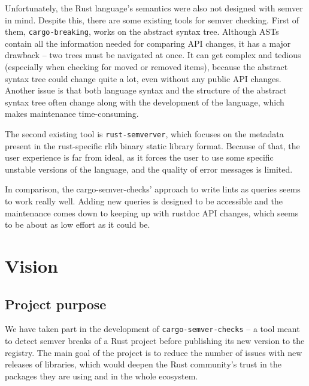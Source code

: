 \documentclass[licencjacka,en]{pracamgr}
\begin{document}
Unfortunately, the Rust language's semantics were also not designed with semver in mind.
Despite this, there are some existing tools for semver checking. First of them,
\texttt{cargo-breaking}, works on the abstract syntax tree. Although ASTs contain all the
information needed for comparing API changes, it has a major drawback -- two trees must be
navigated at once. It can get complex and tedious (especially when checking for moved or removed
items), because the abstract syntax tree could change quite a lot, even without any public API
changes. Another issue is that both language syntax and the structure of the abstract syntax tree
often change along with the development of the language, which makes maintenance time-consuming.

The second existing tool is \texttt{rust-semverver}, which focuses on the metadata present in the
rust-specific rlib binary static library format. Because of that, the user experience is far from
ideal, as it forces the user to use some specific unstable versions of the language, and the
quality of error messages is limited.

In comparison, the cargo-semver-checks' approach to write lints as queries seems to work
really well. Adding new queries is designed to be accessible and the maintenance comes down to
keeping up with rustdoc API changes, which seems to be about as low effort as it could be.


\chapter{Vision}\label{r:chapter_vision}

\section{Project purpose}

We have taken part in the development of \texttt{cargo-semver-checks} -- a tool meant to detect
semver breaks of a Rust project before publishing its new version to the registry. The main goal
of the project is to reduce the number of issues with new releases of libraries, which would deepen
the Rust community's trust in the packages they are using and in the whole ecosystem.
\end{document}
